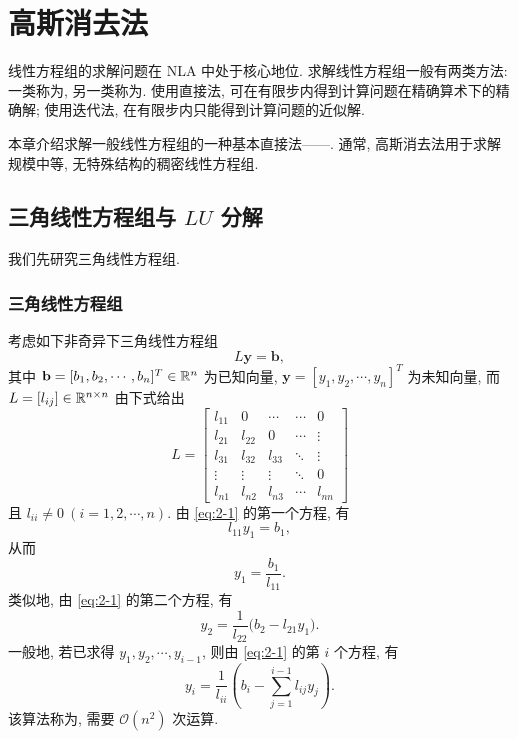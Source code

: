 \chapter{高斯消去法}
\label{ch:gaussian}

线性方程组的求解问题在 NLA 中处于核心地位. 求解线性方程组一般有两类方法: 一类称为, 另一类称为. 使用直接法, 可在有限步内得到计算问题在精确算术下的精确解; 使用迭代法, 在有限步内只能得到计算问题的近似解.

本章介绍求解一般线性方程组的一种基本直接法——. 通常, 高斯消去法用于求解规模中等, 无特殊结构的稠密线性方程组.

\section{三角线性方程组与 $LU$ 分解}

我们先研究三角线性方程组.

\subsection{三角线性方程组}
\label{subsec:2-1-1}

考虑如下非奇异下三角线性方程组
\begin{equation}
  L\mathbf{y}=\mathbf{b},
  \label{eq:2-1}
\end{equation}
其中 $\mathbf{b}=[b_1,b_2,\cdots,b_n]^T\in\mathbb{R}^n$ 为已知向量, $\mathbf{y}=[y_1,y_2,\cdots,y_n]^T$ 为未知向量, 而 $L=[l_{ij}]\in\mathbb{R}^{n\times n}$ 由下式给出
\[
  L=
  \begin{bmatrix}
    l_{11} & 0      & \cdots & \cdots & 0 \\
    l_{21} & l_{22} & 0      & \cdots & \vdots \\
    l_{31} & l_{32} & l_{33} & \ddots & \vdots \\
    \vdots & \vdots & \vdots & \ddots & 0 \\
    l_{n1} & l_{n2} & l_{n3} & \cdots & l_{nn}
  \end{bmatrix}
\]
且 $l_{ii}\neq0\ (i=1,2,\cdots,n)$. 由 \eqref{eq:2-1} 的第一个方程, 有
\[
  l_{11}y_1=b_1,
\]
从而
\[
  y_1=\frac{b_1}{l_{11}}.
\]
类似地, 由 \eqref{eq:2-1} 的第二个方程, 有
\[
  y_2=\frac{1}{l_{22}}\bigl(b_2-l_{21}y_1\bigr).
\]
一般地, 若已求得 $y_1,y_2,\cdots,y_{i-1}$, 则由 \eqref{eq:2-1} 的第 $i$ 个方程, 有
\[
  y_i=\frac{1}{l_{ii}}\left(b_i-\sum_{j=1}^{i-1}l_{ij}y_j\right).
\]
该算法称为, 需要 $\mathcal{O}(n^2)$ 次运算.

